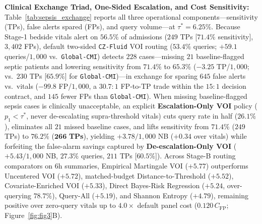 \documentclass[11pt]{article}
\begin{document}
\textbf{Clinical Exchange Triad, One-Sided Escalation, and Cost Sensitivity:} Table~\ref{tab:sepsis_exchange} reports all three operational components---sensitivity (TPs), false alerts spared (FPs), and query volume---at $\tau^*=6.25\%$. Because Stage-1 bedside vitals alert on $56.5\%$ of admissions ($249$ TPs [$71.4\%$ sensitivity], $3{,}402$ FPs), default two-sided \texttt{CZ-Fluid} VOI routing ($53.4\%$ queries; $+59.1$ queries/$1{,}000$ vs.\ \texttt{Global-CMI}) detects $228$ cases---missing $21$ baseline-flagged septic patients and lowering sensitivity from $71.4\%$ to $65.3\%$ ($-3.25$ TP/$1{,}000$; vs.\ $230$ TPs [$65.9\%$] for \texttt{Global-CMI})---in exchange for sparing $645$ false alerts vs.\ vitals ($-99.8$ FP/$1{,}000$, a $30.7:1$ FP-to-TP trade within the $15:1$ decision contract, and $145$ fewer FPs than \texttt{Global-CMI}). When missing baseline-flagged sepsis cases is clinically unacceptable, an explicit \textbf{Escalation-Only VOI} policy ($p_1 < \tau^*$, never de-escalating supra-threshold vitals) cuts query rate in half ($26.1\%$), eliminates all $21$ missed baseline cases, and lifts sensitivity from $71.4\%$ ($249$ TPs) to $\mathbf{76.2\%}$ ($\mathbf{266}$ \textbf{TPs}), yielding $+3.78/1{,}000$ NB ($+0.34$ over vitals) while forfeiting the false-alarm savings captured by \textbf{De-escalation-Only VOI} ($+5.43/1{,}000$ NB, $27.3\%$ queries, $211$ TPs [$60.5\%$]). Across Stage-B routing comparators on $6\text{h}$ summaries, Empirical Martingale VOI ($+5.77$) outperforms Uncentered VOI ($+5.72$), matched-budget Distance-to-Threshold ($+5.52$), Covariate-Enriched VOI ($+5.33$), Direct Bayes-Risk Regression ($+5.24$, over-querying $78.7\%$), Query-All ($+5.19$), and Shannon Entropy ($+4.79$), remaining positive over zero-query vitals up to $4.0\times$ default panel cost ($0.120\,C_{\text{FP}}$; Figure~\ref{fig:fig3}B).
\end{document}

